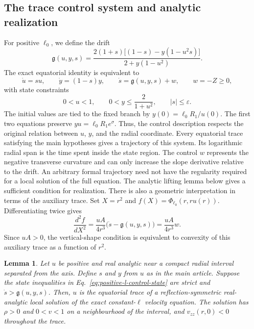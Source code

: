 \documentclass[11pt,a4paper]{article}
\numberwithin{equation}{section}
\theoremstyle{plain}
\newtheorem{lemma}{Lemma}
\theoremstyle{definition}
\theoremstyle{remark}
\newcommand{\ellzero}{\ell_0}
\begin{document}
\subsection{The trace control system and analytic realization}
\label{subsec:approx-flat-sharpness}

For positive $\ellzero$, we define the drift
\begin{equation}\label{eq:positive-l-control-drift}
\mathfrak g(u,y,s)=\frac{2(1+s)\bigl[(1-s)-y(1-u^2s)\bigr]}
{2+y(1-u^2)}.
\end{equation}
The exact equatorial identity is equivalent to
\begin{equation}\label{eq:positive-l-control-system}
\dot u=su,\qquad
\dot y=(1-s)y,\qquad
\dot s=\mathfrak g(u,y,s)+w,\qquad w=-Z\geqslant0,
\end{equation}
with state constraints
\begin{equation}\label{eq:positive-l-control-state}
0<u<1,\qquad
0<y\leqslant\frac{2}{1+u^2},\qquad
|s|\leqslant\varepsilon.
\end{equation}
The initial values are tied to the fixed branch by $y(0)=\ellzero R_1/u(0)$. The first two equations preserve $yu=\ellzero R_1e^\sigma$. Thus, the control description respects the original relation between $u$, $y$, and the radial coordinate. Every equatorial trace satisfying the main hypotheses gives a trajectory of this system. Its logarithmic radial span is the time spent inside the state region. The control $w$ represents the negative transverse curvature and can only increase the slope derivative relative to the drift. An arbitrary formal trajectory need not have the regularity required for a local solution of the full equation. The analytic lifting lemma below gives a sufficient condition for realization. There is also a geometric interpretation in terms of the auxiliary trace. Set $X=r^2$ and
$f(X)=\Phi_{\ellzero}(r,ru(r))$. Differentiating twice gives
\begin{equation}\label{eq:control-convexity-equivalence}
\frac{d^2f}{dX^2}=\frac{uA}{4r^3}\bigl(\dot s-\mathfrak g(u,y,s)\bigr)
=\frac{uA}{4r^3}w.
\end{equation}
Since $uA>0$, the vertical-shape condition is equivalent to convexity of this auxiliary trace as a function of $r^2$.
\begin{lemma}\label{lem:analytic-lifting-trace-controls}
Let $u$ be positive and real analytic near a compact radial interval separated from the axis. Define $s$ and $y$ from $u$ as in the main article. Suppose the state inequalities in Eq.~\eqref{eq:positive-l-control-state} are strict and $\dot s>\mathfrak g(u,y,s)$. Then, $u$ is the equatorial trace of a reflection-symmetric real-analytic local solution of the exact constant-$\ell$ velocity equation. The solution has $\rho>0$ and $0<v<1$ on a neighbourhood of the interval, and $v_{zz}(r,0)<0$ throughout the trace.
\end{lemma}
\end{document}

